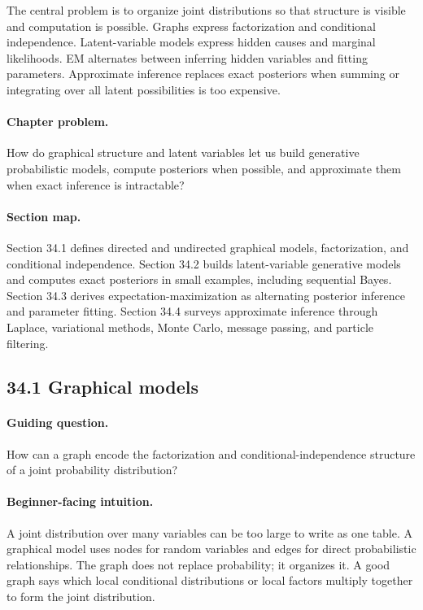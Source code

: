 The central problem is to organize joint distributions so that structure is visible and computation is possible. Graphs express factorization and conditional independence. Latent-variable models express hidden causes and marginal likelihoods. EM alternates between inferring hidden variables and fitting parameters. Approximate inference replaces exact posteriors when summing or integrating over all latent possibilities is too expensive.

\paragraph{Chapter problem.}
How do graphical structure and latent variables let us build generative probabilistic models, compute posteriors when possible, and approximate them when exact inference is intractable?

\paragraph{Section map.}
Section 34.1 defines directed and undirected graphical models, factorization, and conditional independence. Section 34.2 builds latent-variable generative models and computes exact posteriors in small examples, including sequential Bayes. Section 34.3 derives expectation-maximization as alternating posterior inference and parameter fitting. Section 34.4 surveys approximate inference through Laplace, variational methods, Monte Carlo, message passing, and particle filtering.

\subsection{34.1 Graphical models}

\paragraph{Guiding question.}
How can a graph encode the factorization and conditional-independence structure of a joint probability distribution?

\paragraph{Beginner-facing intuition.}
A joint distribution over many variables can be too large to write as one table. A graphical model uses nodes for random variables and edges for direct probabilistic relationships. The graph does not replace probability; it organizes it. A good graph says which local conditional distributions or local factors multiply together to form the joint distribution.

